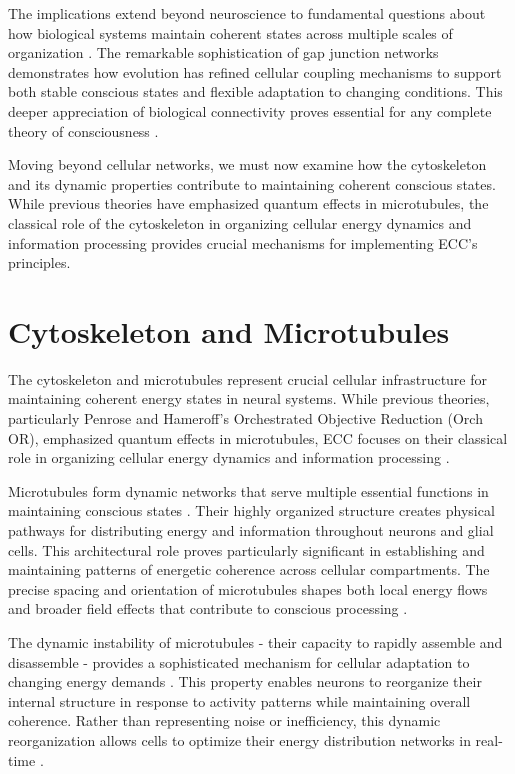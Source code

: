 \begin{refsection}
The implications extend beyond neuroscience to fundamental questions about how biological systems maintain coherent states across multiple scales of organization \cite{Giaume1996}. The remarkable sophistication of gap junction networks demonstrates how evolution has refined cellular coupling mechanisms to support both stable conscious states and flexible adaptation to changing conditions. This deeper appreciation of biological connectivity proves essential for any complete theory of consciousness \cite{Hormuzdi2004}.

Moving beyond cellular networks, we must now examine how the cytoskeleton and its dynamic properties contribute to maintaining coherent conscious states. While previous theories have emphasized quantum effects in microtubules, the classical role of the cytoskeleton in organizing cellular energy dynamics and information processing provides crucial mechanisms for implementing ECC's principles.

\section{Cytoskeleton and Microtubules}

The cytoskeleton and microtubules represent crucial cellular infrastructure for maintaining coherent energy states in neural systems. While previous theories, particularly Penrose and Hameroff's Orchestrated Objective Reduction (Orch OR), emphasized quantum effects in microtubules, ECC focuses on their classical role in organizing cellular energy dynamics and information processing \cite{Fletcher2010}.

Microtubules form dynamic networks that serve multiple essential functions in maintaining conscious states \cite{Baas2011}. Their highly organized structure creates physical pathways for distributing energy and information throughout neurons and glial cells. This architectural role proves particularly significant in establishing and maintaining patterns of energetic coherence across cellular compartments. The precise spacing and orientation of microtubules shapes both local energy flows and broader field effects that contribute to conscious processing \cite{Conde2009}.

The dynamic instability of microtubules - their capacity to rapidly assemble and disassemble - provides a sophisticated mechanism for cellular adaptation to changing energy demands \cite{Howard2003}. This property enables neurons to reorganize their internal structure in response to activity patterns while maintaining overall coherence. Rather than representing noise or inefficiency, this dynamic reorganization allows cells to optimize their energy distribution networks in real-time \cite{Kapitein2015}.


\end{refsection}
